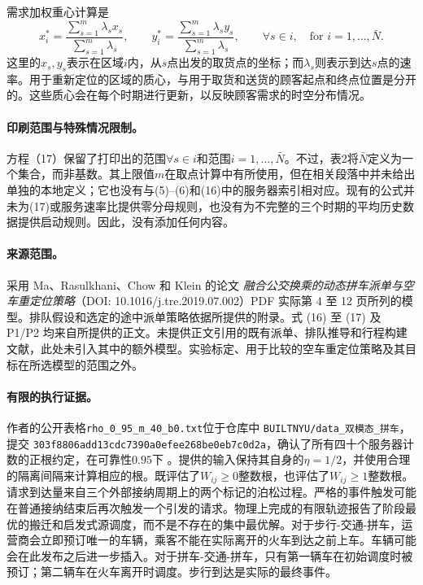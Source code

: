 \documentclass{article}
\begin{document}
需求加权重心计算是
\begin{equation}
x_i^*=\frac{\sum_{s=1}^{m}\lambda_s x_s}{\sum_{s=1}^{m}\lambda_s},
\qquad
y_i^*=\frac{\sum_{s=1}^{m}\lambda_s y_s}{\sum_{s=1}^{m}\lambda_s},
\qquad\forall s\in i,\quad\text{for }i=1,\ldots,\bar N.
\tag{17}
\end{equation}
这里的$x_s,y_s$表示在区域$i$内，从$s$点出发的取货点的坐标；而$\lambda_s$则表示到达$s$点的速率。用于重新定位的区域的质心，与用于取货和送货的顾客起点和终点位置是分开的。这些质心会在每个时期进行更新，以反映顾客需求的时空分布情况。

\paragraph{印刷范围与特殊情况限制。}
方程（17）保留了打印出的范围$\forall s\in i$和范围$i=1,\ldots,\bar N$。不过，表2将$\bar N$定义为一个集合，而非基数。其上限值$m$在取点计算中有所使用，但在相关段落中并未给出单独的本地定义；它也没有与(5)--(6)和(16)中的服务器索引相对应。现有的公式并未为(17)或服务速率比提供零分母规则，也没有为不完整的三个时期的平均历史数据提供启动规则。因此，没有添加任何内容。

\paragraph{来源范围。}
采用 Ma、Rasulkhani、Chow 和 Klein 的论文 \emph{融合公交换乘的动态拼车派单与空车重定位策略}（DOI: 10.1016/j.tre.2019.07.002）PDF 实际第 4 至 12 页所列的模型。排队假设和选定的途中派单策略依据所提供的附录。式 (16) 至 (17) 及 P1/P2 均来自所提供的正文。未提供正文引用的既有派单、排队推导和行程构建文献，此处未引入其中的额外模型。实验标定、用于比较的空车重定位策略及其目标在所选模型的范围之外。


\paragraph{有限的执行证据。}
作者的公开表格\texttt{rho\_0\_95\_m\_40\_b0.txt}位于仓库中
\texttt{BUILTNYU/data\_双模态\_拼车}，提交
\texttt{303f8806add13cdc7390a0efee268be0eb7c0d2a}，确认了所有四十个服务器计数的正根约定，在可靠性\(0.95\)下
。提供的输入保持其自身的\(\eta=1/2\)，并使用合理的隔离间隔来计算相应的根。既评估了\(W_{ij}\ge0\)整数根，也评估了\(W_{ij}\ge1\)整数根。请求到达量来自三个外部接纳周期上的两个标记的泊松过程。严格的事件触发可能在普通接纳结束后再次触发一个引发的请求。物理上完成的有限轨迹报告了阶段最优的搬迁和启发式源调度，而不是不存在的集中最优解。对于步行-交通-拼车，运营商会立即预订唯一的车辆，乘客不能在实际离开的火车到达之前上车。车辆可能会在此发布之后进一步插入。对于拼车-交通-拼车，只有第一辆车在初始调度时被预订；第二辆车在火车离开时调度。步行到达是实际的最终事件。
\end{document}
